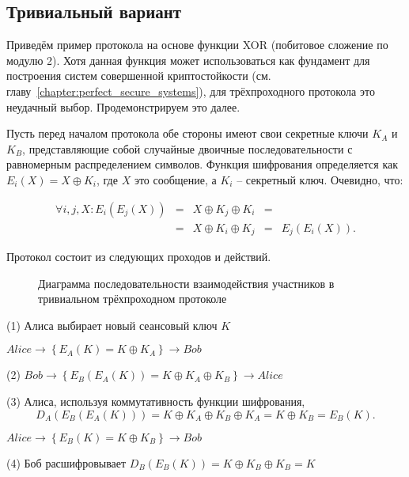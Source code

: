 \subsection{Тривиальный вариант}

Приведём пример протокола на основе функции XOR (побитовое сложение по модулю 2). Хотя данная функция может использоваться как фундамент для построения систем совершенной криптостойкости (см. главу~\ref{chapter:perfect_secure_systems}), для трёхпроходного протокола это неудачный выбор. Продемонстрируем это далее.

Пусть перед началом протокола обе стороны имеют свои секретные ключи $K_A$ и $K_B$, представляющие собой случайные двоичные последовательности с равномерным распределением символов. Функция шифрования определяется как $E_i( X ) = X \oplus K_i$, где $X$ это сообщение, а $K_i$ -- секретный ключ. Очевидно, что:

\[ \begin{matrix}
\forall i, j, X: E_i \left( E_j \left( X \right) \right) & = & X \oplus K_j \oplus K_i & = & \\ 
 & = & X \oplus K_i \oplus K_j & = & E_j \left( E_i \left( X \right) \right).
\end{matrix}
\]

Протокол состоит из следующих проходов и действий.

\begin{figure}[thb]
	\centering
	\begin{sequencediagram}
		
	\end{sequencediagram}
	\caption{Диаграмма последовательности взаимодействия участников в тривиальном трёхпроходном протоколе}
\end{figure}

\begin{protocol}
    \item[(1)] Алиса выбирает новый сеансовый ключ $K$
    \item[{}] $Alice \to \left\{ E_A \left( K \right) = K \oplus K_A \right\} \to Bob$
    \item[(2)] $Bob \to \left\{ E_B \left( E_A \left( K \right) \right) = K \oplus K_A \oplus K_B \right\} \to Alice$
    \item[(3)] Алиса, используя коммутативность функции шифрования,
	\[ D_A \left( E_B \left( E_A \left( K \right) \right) \right) = K \oplus K_A \oplus K_B \oplus K_A = K \oplus K_B = E_B \left( K \right). \]
    \item[{}] $Alice \to \left\{ E_B \left( K \right) = K \oplus K_B \right\} \to Bob$
    \item[(4)] Боб расшифровывает $D_B \left( E_B \left( K \right) \right) = K \oplus K_B \oplus K_B = K$
\end{protocol}

